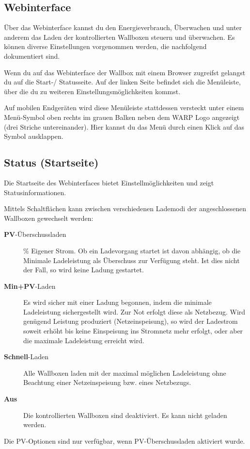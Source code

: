 \documentclass[a4paper,10pt]{article}
\begin{document}
\begin{multicols*}{2}
	\section{Webinterface}

	Über das Webinterface kannst du den Energieverbrauch, Überwachen und 
	unter anderem das Laden der kontrollierten Wallboxen steuern und überwachen.
	Es können diverse Einstellungen vorgenommen werden, die nachfolgend
	dokumentiert sind.

	Wenn du auf das Webinterface der Wallbox mit einem Browser zugreifst
	gelangst du auf die Start-/ Statusseite. Auf der linken Seite befindet sich
	die Menüleiste, über die du zu weiteren Einstellungsmöglichkeiten kommst.

	Auf mobilen Endgeräten wird
	diese Menüleiste stattdessen versteckt unter einem Menü-Symbol oben rechts
	im grauen Balken neben dem WARP Logo angezeigt (\glqq drei Striche untereinander\grqq).
	Hier kannst du das Menü durch einen Klick auf das Symbol ausklappen.

	\vspace{-0.2cm}
	\subsection{Status (Startseite)}
	Die Startseite des Webinterfaces bietet Einstellmöglichkeiten und zeigt
	Statusinformationen.

	Mittels Schaltflächen kann zwischen verschiedenen Lademodi der angeschlossenen 
	Wallboxen gewechselt werden:
	\begin{description}
	\item[\textbf{PV}-Überschussladen] \% Eigener Strom\grqq. Ob ein
	Ladevorgang startet ist davon abhängig, ob die Minimale Ladeleistung
	als Überschuss zur Verfügung steht. Ist dies nicht der Fall, so
	wird keine Ladung gestartet.
	\item[\textbf{Min+PV}-Laden] Es wird sicher mit einer Ladung begonnen, indem 
	die minimale Ladeleistung sichergestellt wird. Zur Not erfolgt diese als
	Netzbezug. Wird genügend Leistung produziert (Netzeinspeisung), so wird
	der Ladestrom soweit erhöht bis keine Einspeisung ins Stromnetz mehr
	erfolgt, oder aber die maximale Ladeleistung erreicht wird.
	\item[\textbf{Schnell}-Laden] Alle Wallboxen laden mit der maximal möglichen
	Ladeleistung ohne Beachtung einer Netzeinspeisung bzw. eines Netzbezugs.
	\item[\textbf{Aus}] Die kontrollierten Wallboxen sind deaktiviert. Es kann
	nicht geladen werden.
	\end{description}
	Die PV-Optionen sind nur verfügbar, wenn PV-Überschussladen aktiviert wurde.


\end{multicols*}
\end{document}
